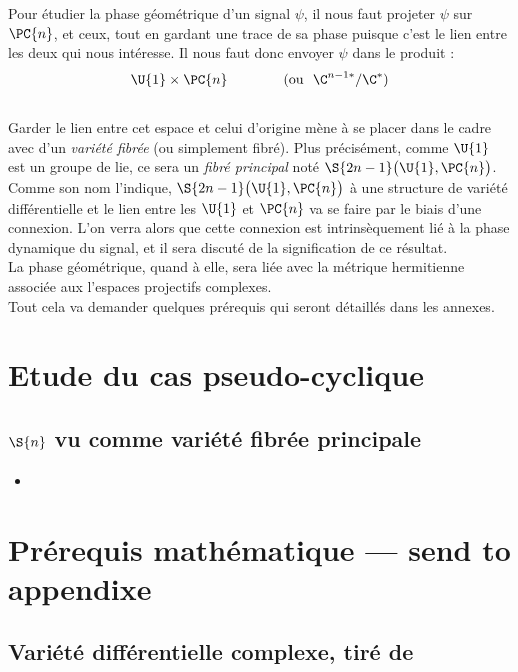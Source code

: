 Pour étudier la phase géométrique d'un signal $\psi$, il nous faut projeter $\psi$ sur $\PC{n}$, et ceux, tout en gardant une trace de sa phase puisque c'est le lien entre les deux qui nous intéresse. Il nous faut donc envoyer $\psi$ dans le produit :
\[\U{1}\times \PC{n}\qquad\qquad (\text{ou }\ \C^{n-1*}/\C^*)\]
\\
Garder le lien entre cet espace et celui d'origine mène à se placer dans le cadre avec d'un \emph{variété fibrée} (ou simplement fibré). Plus précisément, comme $\U{1}$ est un groupe de lie, ce sera un \emph{fibré principal} noté $\S{2n-1}\big(\U{1},\PC{n}\big)$.
\\

Comme son nom l'indique, $\S{2n-1}\big(\U{1},\PC{n}\big)$ à une structure de variété différentielle et le lien entre les $\U{1}$ et $\PC{n}$ va se faire par le biais d'une connexion. L'on verra alors que cette connexion est intrinsèquement lié à la phase dynamique du signal, et il sera discuté de la signification de ce résultat.
\\
La phase géométrique, quand à elle, sera liée avec la métrique hermitienne associée aux l'espaces projectifs complexes.
\\
Tout cela va demander quelques prérequis qui seront détaillés dans les annexes. 



\section{Etude du cas pseudo-cyclique}

\subsection{$\S{n}$ vu comme variété fibrée principale}

\begin{itemize}
	\item 
\end{itemize}


\section{Prérequis mathématique --- send to appendixe}

\subsection{Variété différentielle complexe, tiré de \cite{nakahara_geometry_2003}}



